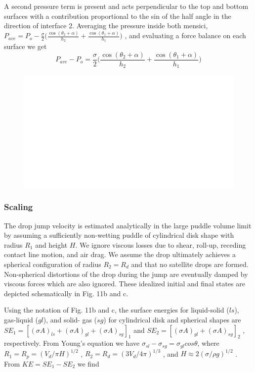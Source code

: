 \documentclass{article}
\begin{document}
A second pressure term is present and acts perpendicular to the top and bottom surfaces with a contribution proportional to the sin of the half angle in the direction of interface 2. Averaging the pressure inside both mensici, $
P_{ave} = P_o -  \frac{\sigma}{2} \Big(  \frac{\cos(\theta_2 + \alpha)}{h_2} +\frac{\cos(\theta_1 + \alpha)}{h_1} \Big)$ , and evaluating a force balance on each surface we get 
$$
P_{ave} - P_o =  \frac{\sigma}{2} \Big(  \frac{\cos(\theta_2 + \alpha)}{h_2} +\frac{\cos(\theta_1 + \alpha)}{h_1} \Big)
$$

\begin{figure}
	\centering
	\includegraphics[scale=0.65]{Figures/Schematic2}
	\caption{}
	\label{fig:schematic}
\end{figure}

\subsubsection*{Scaling}
The drop jump velocity is estimated analytically in the large puddle volume limit by assuming a
sufficiently non-wetting puddle of cylindrical disk shape with radius $R_1$ and height $H$. We ignore viscous
losses due to shear, roll-up, receding contact line motion, and air drag. We assume the drop ultimately
achieves a spherical configuration of radius $R_2 = R_d$ and that no satellite drops are formed. Non-spherical
distortions of the drop during the jump are eventually damped by viscous forces which are also ignored.
These idealized initial and final states are depicted schematically in Fig. 11b and c.

Using the notation of Fig. 11b and c, the surface energies for liquid-solid ($ls$), gas-liquid ($gl$), and solid-
gas ($sg$) for cylindrical disk and spherical shapes are $SE_1 = [(\sigma A)_{ls} + (\sigma A)_{gl} + (\sigma A)_{sg} ]_1$ and $SE_2 = [(\sigma A)_{gl} +
(\sigma A)_{sg} ]_2$ , respectively. From Young’s equation we have $\sigma_{sl} - \sigma_{sg} = \sigma_{gl} cos\theta$, where $R_1 = R_p = (V_d /\pi H)^{1/2}$ , $R_2
= R_d = (3V_d /4\pi)^{1/3}$ , and $H \approx 2(\sigma/\rho g)^{1/2}$ . From $KE = SE_1 - SE_2$ we find
\end{document}
